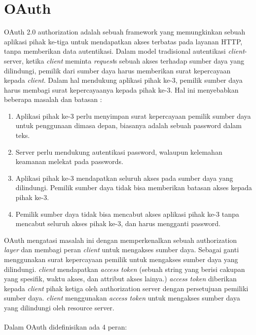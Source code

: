 \section{OAuth}
OAuth 2.0 authorization adalah sebuah framework yang memungkinkan sebuah aplikasi pihak ke-tiga untuk mendapatkan akses terbatas pada layanan HTTP, tanpa memberikan data autentikasi. Dalam model tradisional autentikasi \textit{client}-server, ketika \textit{client} meminta \textit{request}s sebuah akses terhadap sumber daya yang dilindungi, pemilik dari sumber daya harus memberikan surat kepercayaan kepada \textit{client}. Dalam hal mendukung aplikasi pihak ke-3, pemilik sumber daya harus membagi surat kepercayaanya kepada pihak ke-3. Hal ini menyebabkan beberapa masalah dan batasan : 
\begin{enumerate}
	\item Aplikasi pihak ke-3 perlu menyimpan surat kepercayaan pemilik sumber daya untuk penggunaan dimasa depan, biasanya adalah sebuah password dalam teks.
	\item Server perlu mendukung autentikasi password, walaupun kelemahan keamanan melekat pada passwords.
	\item Aplikasi pihak ke-3 mendapatkan seluruh akses pada sumber daya yang dilindungi. Pemilik sumber daya tidak bisa memberikan batasan akses kepada pihak ke-3.
	\item Pemilik sumber daya tidak bisa mencabut akses aplikasi pihak ke-3 tanpa mencabut seluruh akses pihak ke-3, dan harus mengganti password.
\end{enumerate}
OAuth mengatasi masalah ini dengan memperkenalkan sebuah authorization \textit{layer} dan membagi peran \textit{client} untuk mengakses sumber daya. Sebagai ganti menggunakan surat kepercayaan pemilik untuk mengakses sumber daya yang dilindungi. \textit{client} mendapatkan \textit{access token} (sebuah string yang berisi cakupan yang spesifik, waktu akses, dan attribut akses lainya.) \textit{access token} diberikan kepada \textit{client} pihak ketiga oleh authorization server dengan persetujuan pemiliki sumber daya. \textit{client} menggunakan \textit{access token} untuk mengakses sumber daya yang dilindungi oleh resource server.\\\\
Dalam OAuth didefinisikan ada 4 peran:
